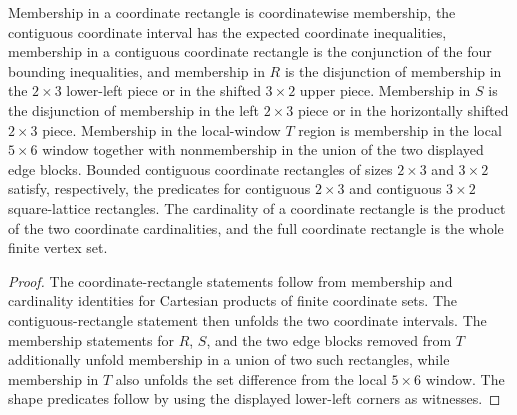 \begin{lemma}%
    \label{lem:peps_squareLatticeCoordinateRegion_identities}
    \leanok
    Membership in a coordinate rectangle is coordinatewise membership, the
    contiguous coordinate interval has the expected coordinate inequalities,
    membership in a contiguous coordinate rectangle is the conjunction of the
    four bounding inequalities, and membership in $R$ is the disjunction of
    membership in the $2\times3$ lower-left piece or in the shifted
    $3\times2$ upper piece. Membership in $S$ is the disjunction of
    membership in the left $2\times3$ piece or in the horizontally shifted
    $2\times3$ piece. Membership in the local-window $T$ region is
    membership in the local $5\times6$ window together with nonmembership in
    the union of the two displayed edge blocks. Bounded contiguous coordinate
    rectangles of sizes $2\times3$ and $3\times2$ satisfy, respectively,
    the predicates for
    contiguous $2\times3$ and contiguous $3\times2$ square-lattice
    rectangles. The cardinality of a coordinate rectangle is the
    product of the two coordinate cardinalities, and the full coordinate
    rectangle is the whole finite vertex set.
\end{lemma}
\begin{proof}\leanok
    The coordinate-rectangle statements follow from membership and cardinality
    identities for Cartesian products of finite coordinate sets. The
    contiguous-rectangle statement then unfolds the two coordinate intervals.
    The membership statements for $R$, $S$, and the two edge blocks removed
    from $T$ additionally unfold membership in a union of two such
    rectangles, while membership in $T$ also unfolds the set difference from
    the local $5\times6$ window. The shape predicates follow by using the
    displayed lower-left corners as witnesses.
\end{proof}

